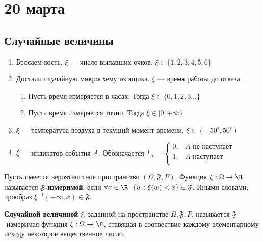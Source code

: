 \chapter{20 марта}

\section{Случайные величины}

\begin{example}\itemfix
    \begin{enumerate}
        \item Бросаем кость. \(\xi\) --- число выпавших очков. \(\xi \in \{1, 2, 3, 4, 5, 6\} \)
        \item Достали случайную микросхему из ящика. \(\xi\) --- время работы до отказа.
              \begin{enumerate}
                  \item Пусть время измеряется в часах. Тогда \(\xi \in \{0, 1, 2, 3 \dots \} \)
                  \item Пусть время измеряется точно. Тогда \(\xi \in [0, +\infty)\)
              \end{enumerate}
        \item \(\xi\) --- температура воздуха в текущий момент времени. \(\xi \in ( - 50^\circ, 50^\circ)\)
        \item \(\xi\) --- индикатор события \(A\). Обозначается \(I_A = \begin{cases}
                  0, & A \text{ не наступает} \\
                  1, & A \text{ наступает}    \\
              \end{cases}\)
    \end{enumerate}
\end{example}

\begin{definition}
    Пусть имеется вероятностное пространство \((\Omega, \mathfrak{F}, P)\). Функция \(\xi : \Omega \to \R\) называется \textbf{\(\mathfrak{F}\)-измеримой}, если \(\forall x\in \R  \ \ \{w : \xi(w) < x\} \in \mathfrak{F}\). Иными словами, прообраз \(\xi^{ - 1}( - \infty, x)\in \mathfrak{F}\).
\end{definition}

\begin{definition}
    \textbf{Случайной величиной} \(\xi\), заданной на пространстве \(\Omega, \mathfrak{F}, P\), называется \(\mathfrak{F}\)-измеримая функция \(\xi : \Omega \to \R\), ставящая в соотвествие каждому элементарному исходу некоторое вещественное число.
\end{definition}

